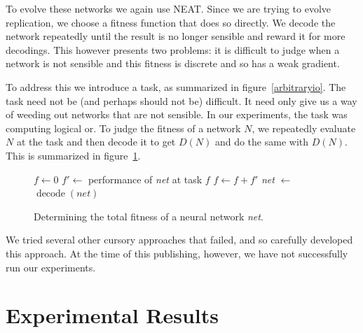 \documentclass[12pt]{article}
\begin{document}
To evolve these networks we again use NEAT.
Since we are trying to evolve replication,
we choose a fitness function that does so directly.
We decode the network repeatedly
until the result is no longer sensible
and reward it for more decodings.
This however presents two problems:
it is difficult to judge when a network is not sensible
and this fitness is discrete and so has a weak gradient.

To address this we introduce a task,
as summarized in figure~\ref{arbitraryio}.
The task need not be (and perhaps should not be)
difficult.
It need only give us a way
of weeding out networks that are not sensible.
In our experiments,
the task was computing logical or.
To judge the fitness of a network $N$,
we repeatedly evaluate $N$ at the task
and then decode it to get $D(N)$
and do the same with $D(N)$.
This is summarized in figure~\ref{fitalg}.

\begin{figure}[h]
  \centering
  \begin{minipage}[c]{.5\textwidth}
  \begin{algorithmic}
  \STATE $f \leftarrow 0$
  \LOOP
  \STATE $f' \leftarrow$ performance of \textit{net} at task
  \RETURN $f$
  \ENDIF
  \STATE $f \leftarrow f + f'$
  \STATE \textit{net} $\leftarrow$
    $\operatorname{decode}(\textit{net})$
  \ENDLOOP
  \end{algorithmic}
  \caption{Determining the total fitness
    of a neural network \textit{net}.}
  \label{fitalg}
  \end{minipage}
\end{figure}




We tried several other cursory approaches that failed,
and so carefully developed this approach.
At the time of this publishing, however,
we have not successfully run our experiments.

\section{Experimental Results}
\label{results}
\end{document}
